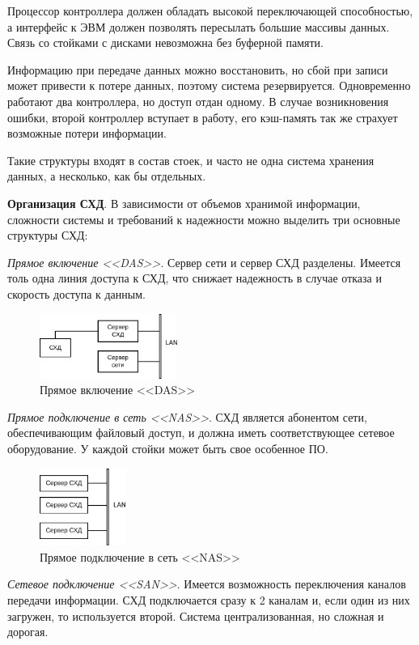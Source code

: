 \documentclass[unicode, 12pt, a4paper, oneside]{article}
\begin{document}
Процессор контроллера должен обладать высокой переключающей способностью, а интерфейс к ЭВМ должен позволять пересылать большие массивы данных. Связь со стойками с дисками невозможна без буферной памяти.

Информацию при передаче данных можно восстановить, но сбой при записи может привести к потере данных, поэтому система резервируется. Одновременно работают два контроллера, но доступ отдан одному. В случае возникновения ошибки, второй контроллер вступает в работу, его кэш-память так же страхует возможные потери информации.

Такие структуры входят в состав стоек, и часто не одна система хранения данных, а несколько, как бы отдельных.

\textbf{Организация СХД}. В зависимости от объемов хранимой информации, сложности системы и требований к надежности можно выделить три основные структуры СХД:

\textit{Прямое включение <<DAS>>}. Сервер сети и сервер СХД разделены. Имеется толь одна линия доступа к СХД, что снижает надежность в случае отказа и скорость доступа к данным.

\begin{figure}[H]
\centering
\includegraphics[width=0.4\textwidth]{151_das.pdf}
\caption{Прямое включение <<DAS>>}
\end{figure}

\textit{Прямое подключение в сеть <<NAS>>}. СХД является абонентом сети, обеспечивающим файловый доступ, и должна иметь соответствующее сетевое оборудование. У каждой стойки может быть свое особенное ПО.

\begin{figure}[H]
\centering
\includegraphics[width=0.25\textwidth]{151_nas.pdf}
\caption{Прямое подключение в сеть <<NAS>>}
\end{figure}

\textit{Сетевое подключение <<SAN>>}. Имеется возможность переключения каналов передачи информации. СХД подключается сразу к 2 каналам и, если один из них загружен, то используется второй. Система централизованная, но сложная и дорогая.
\end{document}
